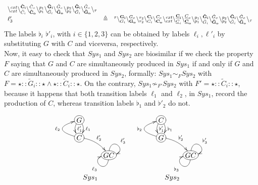 {\[\begin{array}{lcl @{\hspace{0.3cm}}lcl}
\chainedlink{cxt}{cxt}\chainedlink{\hat{C}_i}{\bf \hat{C}_i}\chainedlink{\bf \hat{C}_o}{\hat{C}_o}
\chainedlink{p_1}{p_1}\chainedlink{\tilde{G}_i}{\bf \tilde{G}_i}\chainedlink{\bf \tilde{G}_o}{\tilde{G}_o}\chainedlink{p_2}{p_2}\chainedlink{\tilde{G}_i}{\bf \tilde{G}_i}\chainedlink{\bf \tilde{G}_o}{\tilde{G}_o}\chainend{\silent}
\\
\ell'_3 & \defeq &  \startchain{\silent}\chainedlink{G_i}{\bf G_i}\chainedlink{\bf G_o}{G_o}\chainedlink{r_2}{r_2}\chainedlink{C_i}{\bf C_i}\chainedlink{\bf C_o}{C_o}
\chainedlink{cxt}{cxt}\chainedlink{\underline{C}_i}{\bf \underline{C}_i}\chainedlink{\bf \underline{C}_o}{\underline{C}_o}
\chainedlink{p_1}{p_1}\chainedlink{\tilde{G}_i}{\bf \tilde{G}_i}\chainedlink{\bf \tilde{G}_o}{\tilde{G}_o}\chainedlink{p_2}{p_2}\chainedlink{\tilde{G}_i}{\bf \tilde{G}_i}\chainedlink{\bf \tilde{G}_o}{\tilde{G}_o}\chainend{\silent}
\end{array}
\]
}
The labels $\flat_i$ $\flat'_i$, with $i \in \{1,2,3\}$ can be obtained by labels $\ell_i,\ell'_i$ by substituting $G$ with $C$ and viceversa, respectively.
\\
Now, it easy to check that $Sys_1$ and $Sys_2$ are biosimilar if we check the property $F$ saying that $G$ and $C$ are simultaneously  produced in $Sys_1$ if and only if 
$G$ and $C$ are simultaneously  produced in $Sys_2$, formally:
$Sys_1 \sim_F Sys_2$ with $F= \star :: \tilde{G}_i :: \star \wedge  \star :: \tilde{C}_i :: \star $.
On the contrary, $Sys_1 \not \sim_{F'} Sys_2$  with $F' =  \star :: \tilde{C}_i :: \star $, 
because it happens that both  transition labels $\ell_1$  and $\ell_2$, in $Sys_1$, record the production of $C$, whereas 
transition labels $\flat_1$ and $\flat'_2$ do not.
\begin{figure}\label{fig:ltss}
\[
\begin{array}{cc}
\xymatrix@R-1pc{
*+[o][F-]{G} \ar@/ ^/[d]^{\ell_1} \ar@/_/[d]^{\ell'_1} \\
*+[o][F-]{C} \ar@/^2pc/[u]^{\ell_2} \ar@/^/[dr]^{\ell'_2} \\ %
& *+[o][F-]{GC}\ar@(d,l)^{\ell_3}\ar@(u,r)^{\ell'_3}
}
&
\xymatrix@R-1pc{
*+[o][F-]{C} \ar@/ ^/[d]^{\flat_1} \ar@/_/[d]^{\flat'_1} \\
*+[o][F-]{G} \ar@/^2pc/[u]^{\flat_2} \ar@/^/[dr]^{\flat'_2} \\ 
& *+[o][F-]{GC}\ar@(d,l)^{\flat_3}\ar@(u,r)^{\flat'_3}
}\\
Sys_1 & Sys_2
\end{array}
\]\end{figure}